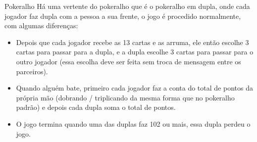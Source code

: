 \begin{subsecao}{Pokeralho}
Há uma vertente do pokeralho que é o pokeralho em dupla, onde cada jogador faz
dupla com a pessoa a sua frente, o jogo é procedido normalmente, com algumas
diferenças: 
\begin{itemize}
\item Depois que cada jogador recebe as 13 cartas e as arruma, ele então
escolhe 3 cartas para passar para a dupla, e a dupla escolhe 3 cartas para
passar para o outro jogador (essa escolha deve ser feita sem troca de mensagem
entre os parceiros). 
\item Quando alguém bate, primeiro cada jogador faz a conta do total de pontos
da própria mão (dobrando / triplicando da mesma forma que no pokeralho padrão)
e depois cada dupla soma o total de pontos. 
\item O jogo termina quando uma das duplas faz 102 ou mais, essa dupla perdeu o
jogo. 
\pagebreak
\end{itemize}
\end{subsecao}
